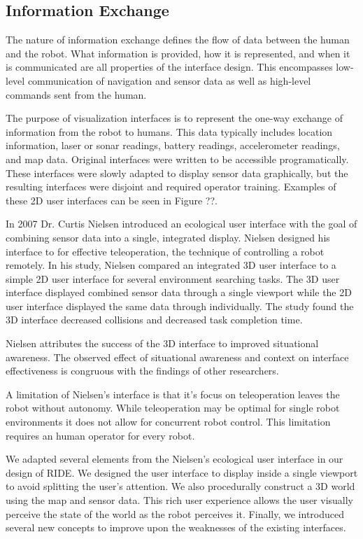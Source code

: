 \subsection{Information Exchange}

The nature of information exchange defines the flow of data between the human and the robot. What information is provided, how it is represented, and when it is communicated are all properties of the interface design. This encompasses low-level communication of navigation and sensor data as well as high-level commands sent from the human. 

The purpose of visualization interfaces is to represent the one-way exchange of information from the robot to humans. This data typically includes location information, laser or sonar readings, battery readings, accelerometer readings, and map data. Original interfaces were written to be accessible programatically. These interfaces were slowly adapted to display sensor data graphically, but the resulting interfaces were disjoint and required operator training. Examples of these 2D user interfaces can be seen in Figure ??.

In 2007 Dr. Curtis Nielsen introduced an ecological user interface with the goal of combining sensor data into a single, integrated display. Nielsen designed his interface to for effective teleoperation, the technique of controlling a robot remotely. In his study, Nielsen compared an integrated 3D user interface to a simple 2D user interface for several environment searching tasks. The 3D user interface displayed combined sensor data through a single viewport while the 2D user interface displayed the same data through individually. The study found the 3D interface decreased collisions and decreased task completion time.

Nielsen attributes the success of the 3D interface to improved situational awareness. The observed effect of situational awareness and context on interface effectiveness is congruous with the findings of other researchers.

A limitation of Nielsen's interface is that it's focus on teleoperation leaves the robot without autonomy. While teleoperation may be optimal for single robot environments it does not allow for concurrent robot control. This limitation requires an human operator for every robot.

We adapted several elements from the Nielsen's ecological user interface in our design of RIDE. We designed the user interface to display inside a single viewport to avoid splitting the user's attention. We also procedurally construct a 3D world using the map and sensor data. This rich user experience allows the user visually perceive the state of the world as the robot perceives it. Finally, we introduced several new concepts to improve upon the weaknesses of the existing interfaces. 

